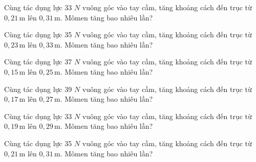 \begin{ex}
Cùng tác dụng lực 33 $N$ vuông góc vào tay cầm, tăng khoảng cách đến trục từ $0,21\,\text{m}$ lên $0,31\,\text{m}$. Mômen tăng bao nhiêu lần?
\end{ex}

\begin{ex}
Cùng tác dụng lực 35 $N$ vuông góc vào tay cầm, tăng khoảng cách đến trục từ $0,23\,\text{m}$ lên $0,33\,\text{m}$. Mômen tăng bao nhiêu lần?
\end{ex}

\begin{ex}
Cùng tác dụng lực 37 $N$ vuông góc vào tay cầm, tăng khoảng cách đến trục từ $0,15\,\text{m}$ lên $0,25\,\text{m}$. Mômen tăng bao nhiêu lần?
\end{ex}

\begin{ex}
Cùng tác dụng lực 39 $N$ vuông góc vào tay cầm, tăng khoảng cách đến trục từ $0,17\,\text{m}$ lên $0,27\,\text{m}$. Mômen tăng bao nhiêu lần?
\end{ex}

\begin{ex}
Cùng tác dụng lực 33 $N$ vuông góc vào tay cầm, tăng khoảng cách đến trục từ $0,19\,\text{m}$ lên $0,29\,\text{m}$. Mômen tăng bao nhiêu lần?
\end{ex}

\begin{bt}
Cùng tác dụng lực 35 $N$ vuông góc vào tay cầm, tăng khoảng cách đến trục từ $0,21\,\text{m}$ lên $0,31\,\text{m}$. Mômen tăng bao nhiêu lần?
\end{bt}

